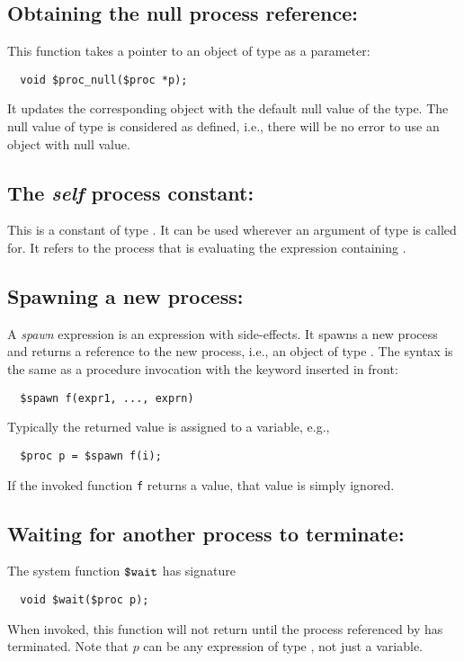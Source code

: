 \subsection{Obtaining the null process reference: \cprocNull}

This function takes a pointer to an object of \cproc{} type as a parameter:

\begin{verbatim}
  void $proc_null($proc *p);
\end{verbatim}

It updates the corresponding object with the default null value of the \cproc{} type.
The null value of \cproc{} type is considered as defined, i.e., there will be no
error to use an \cproc{} object with null value.

\subsection{The \emph{self} process constant: \cself}

This is a constant of type \cproc. It can be used wherever an argument
of type \cproc{} is called for. It refers to the process that is
evaluating the expression containing \cself.

\subsection{Spawning a new process: \cspawn}

A \emph{spawn} expression is an expression with side-effects.  It
spawns a new process and returns a reference to the new process, i.e.,
an object of type \cproc.  The syntax is the same as a procedure
invocation with the keyword \cspawn{} inserted in front:
\begin{verbatim}
  $spawn f(expr1, ..., exprn)
\end{verbatim}
Typically the returned value is assigned to a variable, e.g.,
\begin{verbatim}
  $proc p = $spawn f(i);
\end{verbatim}
If the invoked function \texttt{f} returns a value, that value is
simply ignored.

\subsection{Waiting for another process to terminate: \cwait}

The system function $\mbox{\texttt{\${}wait}}$ has signature
\begin{verbatim}
  void $wait($proc p);
\end{verbatim}
When invoked, this function will not return until the process
referenced by  has terminated. Note that $p$ can be any
expression of type \cproc{}, not just a variable.

